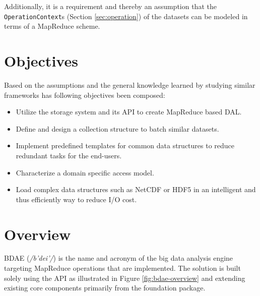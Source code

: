 Additionally, it is a requirement and thereby an assumption that the \texttt{OperationContext}s (Section \ref{sec:operation}) of the datasets can be modeled in terms of a MapReduce scheme.

\section{Objectives} \label{sec:bdae-objectives}
Based on the assumptions and the general knowledge learned by studying similar frameworks has following objectives been composed:
\begin{itemize}
	\item Utilize the \CodeName storage system and its API to create MapReduce based DAL.
	\item Define and design a collection structure to batch similar datasets.
	\item Implement predefined templates for common data structures to reduce redundant tasks for the end-users.
	\item Characterize a domain specific access model.
	\item Load complex data structures such as NetCDF\cite{PageNetCDF} or HDF5\cite{PageHDF5}\cite{Collette:2013:Python} in an intelligent and thus efficiently way to reduce I/O cost.
\end{itemize}

\section{Overview}
BDAE (\textit{/b'dei'/}) is the name and acronym of the big data analysis engine targeting MapReduce operations that are implemented. The solution is built solely using the \CodeName API as illustrated in Figure \ref{fig:bdae-overview} and extending existing core components primarily from the foundation package.


